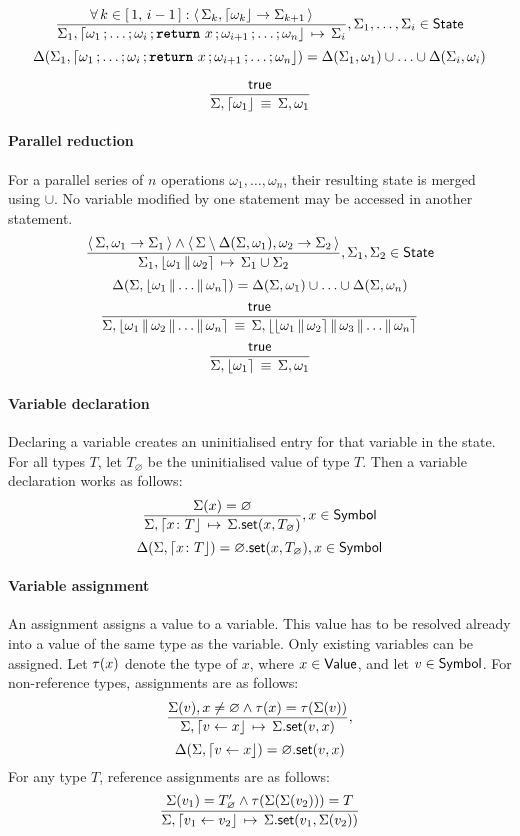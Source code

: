 $$
\semrule{
	\forall\, k \in \range{1}{i-1}: \results{\Sigma_k}{\stmt{\omega_k}}{\Sigma_{k+1}}}
	{\Sigma_1, \stmt{\omega_1}{\ldots}{\omega_i}{\retstmt{x}}{\omega_{i+1}}{\ldots}{\omega_n}}
	{\Sigma_i},
	\Sigma_1, \ldots, \Sigma_i \in \State
$$
$$
	\Delta(\Sigma_1, \stmt{\omega_1}{\ldots}{\omega_i}{\retstmt{x}}{\omega_{i+1}}{\ldots}{\omega_n}) =
		\Delta(\Sigma_1, \omega_1) \cup \ldots \cup \Delta(\Sigma_i, \omega_i)
$$

$$
\semruleeq{\true}
	{\Sigma, \stmt{\omega_1}}
	{\Sigma, \omega_1}
$$

\paragraph{Parallel reduction}
For a parallel series of $n$ operations $\omega_1, \ldots, \omega_n$, their resulting state is merged using $\cup$.
No variable modified by one statement may be accessed in another statement.
$$
	\semrule{
		\results{\Sigma}{\omega_1}{\Sigma_1} \land
		\results{\Sigma \setminus \Delta(\Sigma, \omega_1)}{\omega_2}{\Sigma_2}}
		{\Sigma_1, \parstmt{\omega_1}{\omega_2}}
		{\Sigma_1 \cup \Sigma_2},
			\Sigma_1, \Sigma_2 \in \State
$$
$$
	\Delta(\Sigma, \parstmt{\omega_1}{\ldots}{\omega_n}) = \Delta(\Sigma, \omega_1) \cup \ldots \cup \Delta(\Sigma, \omega_n)
$$
$$
	\semruleeq{\true}
		{\Sigma, \parstmt{\omega_1}{\omega_2}{\ldots}{\omega_n}}
		{\Sigma, \parstmt{\parstmt{\omega_1}{\omega_2}}{\omega_3}{\ldots}{\omega_n}}
$$
$$
\semruleeq{\true}
	{\Sigma, \parstmt{\omega_1}}
	{\Sigma, \omega_1}
$$

\paragraph{Variable declaration}
Declaring a variable creates an uninitialised entry for that variable in the state.
For all types $T$, let $T_\varnothing$ be the uninitialised value of type $T$.
Then a variable declaration works as follows:
$$
\semrule
	{\Sigma(x) = \varnothing}
	{\Sigma, \stmt{\varv{x}{T}}}
	{\StSet{\Sigma}{x}{T_\varnothing}},
		x \in \Symbol
$$
$$
\Delta(\Sigma, \stmt{\varv{x}{T}}) = \StSet{\varnothing}{x}{T_\varnothing},
                x \in \Symbol
$$

\paragraph{Variable assignment}
An assignment assigns a value to a variable.
This value has to be resolved already into a value of the same type as the variable.
Only existing variables can be assigned.
Let $\tau(x)$ denote the type of $x$, where $x \in \mathsf{Value}$, and let $v \in \mathsf{Symbol}$.
For non-reference types, assignments are as follows:
$$
\semrule
	{\Sigma(v), x \neq \varnothing \land
		\typeof{x} = \typeof{\Sigma(v)}}
	{\Sigma, \stmt{v \gets x}}
	{\StSet{\Sigma}{v}{x}},
$$
$$
\Delta(\Sigma, \stmt{v \gets x}) = \StSet{\varnothing}{v}{x}
$$
For any type $T$, reference assignments are as follows:
$$
\semrule
	{\Sigma(v_1) = \reft{T}_\varnothing \land
		\typeof{\Sigma(\Sigma(v_2))} = T}
	{\Sigma, \stmt{v_1 \gets v_2}}
	{\StSet{\Sigma}{v_1}{\Sigma(v_2)}}
$$

